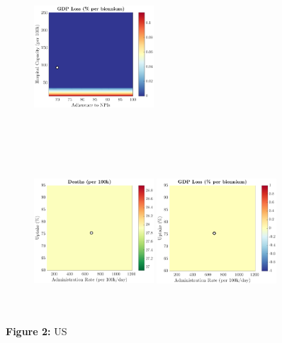 \documentclass[paper=a4, fontsize=11pt]{scrartcl}
\numberwithin{figure}{section}
\numberwithin{table}{section}
\begin{document}
\begin{figure}[H]
\begin{subfigure}[b]{\textwidth}
	\hspace{0.05cm}
    	\includegraphics[width=0.49\textwidth,height=6cm]{US/SWINE/npl_g}
    \end{subfigure}
    \begin{subfigure}[b]{\textwidth}
      	\includegraphics[width=0.49\textwidth,height=6cm]{US/SWINE/imm_d}
	\hspace{0.05cm}
    	\includegraphics[width=0.49\textwidth,height=6cm]{US/SWINE/imm_g}
    \end{subfigure}
\caption*{\textbf{Figure 2:} US} 
\end{figure}
\end{document}
